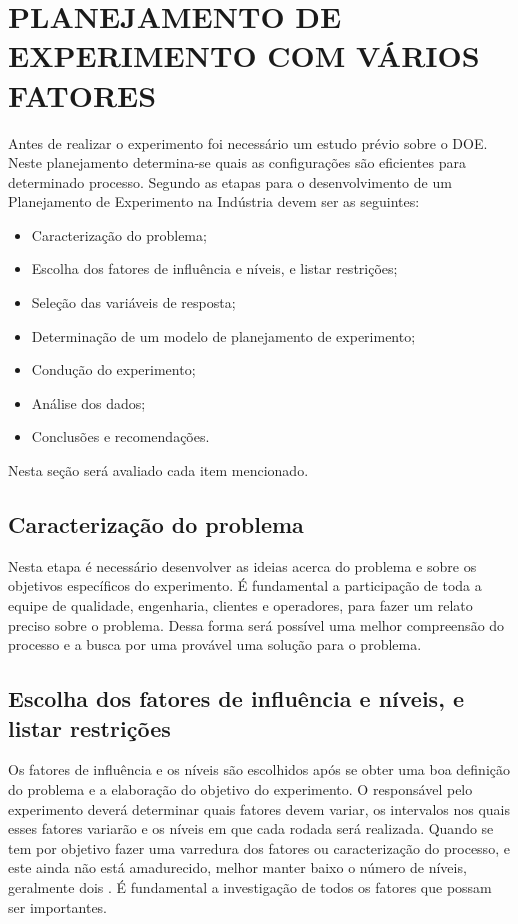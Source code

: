 \chapter{PLANEJAMENTO DE EXPERIMENTO COM VÁRIOS FATORES}
\label{chap:estudo}

Antes de realizar o experimento foi necessário um estudo prévio sobre o \ac{DOE}. Neste planejamento determina-se quais as configurações são eficientes para determinado processo.
Segundo \cite{coleman1993systematic}  as etapas para o desenvolvimento de um Planejamento de Experimento na Indústria devem ser as seguintes:
\begin{itemize}
    \item Caracterização do problema;
    \item Escolha dos fatores de influência e níveis, e listar restrições;
    \item Seleção das variáveis de resposta;
    \item Determinação de um modelo de planejamento de experimento;
    \item Condução do experimento;
    \item Análise dos dados;
    \item Conclusões e recomendações.
\end{itemize}
Nesta seção será avaliado cada item mencionado.

\section{Caracterização do problema}
Nesta etapa é necessário desenvolver as ideias acerca do problema e sobre os objetivos específicos do experimento. É  fundamental a participação de toda a equipe de qualidade, engenharia, clientes e operadores, para fazer um relato preciso sobre o problema. Dessa forma será possível uma melhor compreensão do processo e a busca por uma provável uma solução para o problema.

\section{Escolha dos fatores de influência e níveis, e listar restrições}
Os fatores de influência e os níveis são escolhidos após se obter uma boa definição do problema e a elaboração do objetivo do experimento. O responsável pelo experimento deverá determinar quais fatores devem variar, os intervalos nos quais esses fatores variarão e os níveis em que cada rodada será realizada. Quando se tem por objetivo fazer uma varredura dos fatores ou caracterização do processo, e este ainda não está amadurecido, melhor manter baixo o número de níveis, geralmente dois \cite{melhorespraticas}. É fundamental a investigação de todos os fatores que possam ser importantes.

